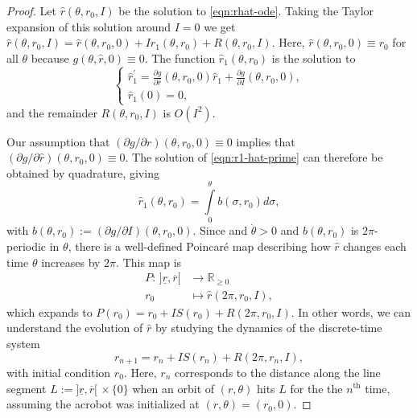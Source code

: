 \documentclass[journal,twoside,web]{ieeecolor}
\begin{document}
{\begin{proof}
    Let \(\hat{r}(\theta,r_0,I)\) be the solution to \eqref{eqn:rhat-ode}.
    Taking the Taylor expansion of this solution around \(I = 0\) we get
    \(\hat{r}(\theta,r_0,I) = \hat{r}(\theta,r_0,0) + I\hat{r}_1(\theta,r_0) 
    + R(\theta,r_0,I)\). 
    Here, \(\hat{r}(\theta,r_0,0) \equiv r_0\) for all \(\theta\) because
    \(g(\theta,\hat{r},0) \equiv 0\).
    The function \(\hat{r}_1(\theta,r_0)\) is the solution to
    \begin{equation}\label{eqn:r1-hat-prime}
        \begin{cases}
        \hat{r}_1^\prime = 
        \frac{\partial g}{\partial \hat{r}}(\theta,r_0,0)\hat{r}_1 +
        \frac{\partial g}{\partial I}(\theta,r_0,0)
        , \\
        \hat{r}_1(0) = 0
        ,
    \end{cases}
    \end{equation}
    and the remainder \(R(\theta,r_0,I)\) is \(O(I^2)\).

    Our assumption that \((\partial g/\partial r)(\theta,r_0,0) \equiv 0\)
    implies that \((\partial g/\partial \hat{r})(\theta,r_0,0) \equiv 0\).
    The solution of \ref{eqn:r1-hat-prime} can therefore be obtained by
    quadrature, giving
    \[
        \hat{r}_1(\theta,r_0) = \int\limits_0^\theta b(\sigma,r_0)d\sigma
        ,
    \]
    with \(b(\theta,r_0) := (\partial g/\partial I)(\theta,r_0,0)\). 
    Since and \(\dot{\theta} > 0\) and \(b(\theta,r_0)\) is \(2\pi\)-periodic in
    \(\theta\), there is a well-defined Poincar\'{e} map describing
    how \(\hat{r}\) changes each time \(\theta\) increases by \(2\pi\).
    This map is 
    \begin{align*}
        P : \, ]\underline{r},\overline{r}[ &\to \mathbb{R}_{\geq 0} \\
        r_0 &\mapsto \hat{r}(2\pi,r_0,I)
        ,
    \end{align*}
    which expands to \(P(r_0) = r_0 + IS(r_0) + R(2\pi,r_0,I)\).
    In other words, we can understand the evolution of \(\hat{r}\) by studying
    the dynamics of the discrete-time system
    \begin{equation}\label{eqn:r-discrete}
        r_{n+1} = r_n + IS(r_n) + R(2\pi,r_n,I)
        ,
    \end{equation}
    with initial condition \(r_0\).
    Here, \(r_n\) corresponds to the distance along the line segment
    \(L := ]\underline{r},\overline{r}[ \, \times \{0\}\)
    when an orbit of \((r,\theta)\) hits \(L\) for the the \(n^\text{th}\) time,
    assuming the acrobot was initialized at \((r,\theta) = (r_0,0)\).


\end{proof}}
\end{document}
